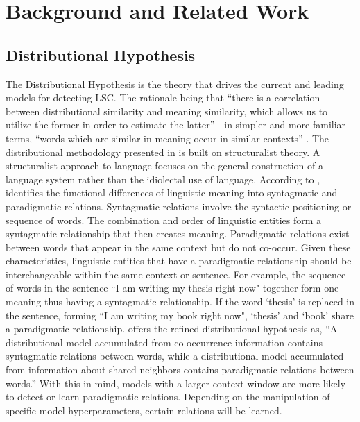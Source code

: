 \section{Background and Related Work}
\label{sec:background}

\subsection{Distributional Hypothesis}

The Distributional Hypothesis is the theory that drives the current and leading models for detecting LSC. The rationale being that “there is a correlation between distributional similarity and meaning similarity, which allows us to utilize the former in order to estimate the latter”—in simpler and more familiar terms, “words which are similar in meaning occur in similar contexts” \citep{sahlgren2008distributional}. The distributional methodology presented in \citet{harris1970distributional} is built on structuralist theory. A structuralist approach to language focuses on the general construction of a language system rather than the idiolectal use of language. According to \citet{sahlgren2008distributional}, \citet{saussure1916} identifies the functional differences of linguistic meaning into syntagmatic and paradigmatic relations. Syntagmatic relations involve the syntactic positioning or sequence of words. The combination and order of linguistic entities form a syntagmatic relationship that then creates meaning. Paradigmatic relations exist between words that appear in the same context but do not co-occur. Given these characteristics, linguistic entities that have a paradigmatic relationship should be interchangeable within the same context or sentence. For example, the sequence of words in the sentence ``I am writing my thesis right now" together form one meaning thus having a syntagmatic relationship. If the word `thesis' is replaced in the sentence, forming ``I am writing my book right now", `thesis' and `book' share a paradigmatic relationship. \citet{sahlgren2008distributional} offers the refined distributional hypothesis as, “A distributional model accumulated from co-occurrence information contains syntagmatic relations between words, while a distributional model accumulated from information about shared neighbors contains paradigmatic relations between words.” With this in mind, models with a larger context window are more likely to detect or learn paradigmatic relations. Depending on the manipulation of specific model hyperparameters, certain relations will be learned. 


